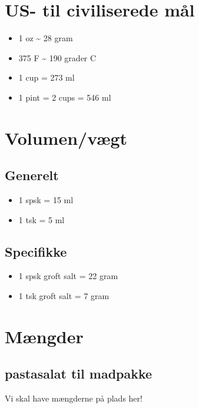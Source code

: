 \documentclass[
]{book}
\providecommand{\tightlist}{%
  \setlength{\itemsep}{0pt}\setlength{\parskip}{0pt}}
\begin{document}
\section{US- til civiliserede mål}\label{us--til-civiliserede-muxe5l}

\begin{itemize}
\tightlist
\item
  1 oz \textasciitilde{} 28 gram
\item
  375 F \textasciitilde{} 190 grader C
\item
  1 cup = 273 ml
\item
  1 pint = 2 cups = 546 ml
\end{itemize}

\section{Volumen/vægt}\label{volumenvuxe6gt}

\subsection{Generelt}\label{generelt}

\begin{itemize}
\tightlist
\item
  1 spsk = 15 ml
\item
  1 tsk = 5 ml
\end{itemize}

\subsection{Specifikke}\label{specifikke}

\begin{itemize}
\tightlist
\item
  1 spsk groft salt = 22 gram
\item
  1 tsk groft salt = 7 gram
\end{itemize}

\section{Mængder}\label{muxe6ngder}

\subsection{pastasalat til madpakke}\label{pastasalat-til-madpakke}

Vi skal have mængderne på plads her!
\end{document}
